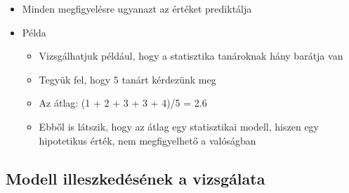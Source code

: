 \documentclass[
  letterpaper,
  DIV=11,
  numbers=noendperiod]{scrreprt}
\begin{document}
\begin{itemize}
\item
  Minden megfigyelésre ugyanazt az értéket prediktálja
\item
  Példa

  \begin{itemize}
  \item
    Vizsgálhatjuk például, hogy a statisztika tanároknak hány barátja
    van
  \item
    Tegyük fel, hogy 5 tanárt kérdezünk meg
  \item
    Az átlag: (1 + 2 + 3 + 3 + 4)/5 = 2.6
  \item
    Ebből is látszik, hogy az átlag egy statisztikai modell, hiszen egy
    hipotetikus érték, nem megfigyelhető a valóságban
  \end{itemize}
\end{itemize}

\hypertarget{modell-illeszkeduxe9suxe9nek-a-vizsguxe1lata}{%
\subsection{Modell illeszkedésének a
vizsgálata}\label{modell-illeszkeduxe9suxe9nek-a-vizsguxe1lata}}
\end{document}
